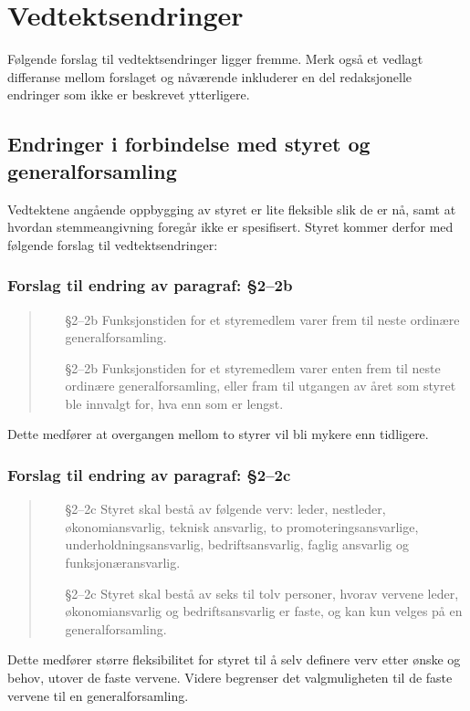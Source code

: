 \documentclass[10pt,norsk,a4paper]{article}
\begin{document}
\section{Vedtektsendringer}
Følgende forslag til vedtektsendringer ligger fremme. Merk også et vedlagt differanse mellom forslaget og nåværende inkluderer en del redaksjonelle endringer som ikke er beskrevet ytterligere.

\subsection{Endringer i forbindelse med styret og generalforsamling}
Vedtektene angående oppbygging av styret er lite fleksible slik de er nå, samt at hvordan stemmeangivning foregår ikke er spesifisert. Styret kommer derfor med følgende forslag til vedtektsendringer:

\subsubsection{Forslag til endring av paragraf: §2--2b}
\begin{quote}
	\begin{enumerate}
		\item[§2--2b] Funksjonstiden for et styremedlem varer frem til neste ordinære generalforsamling.
		\item[§2--2b] Funksjonstiden for et styremedlem varer enten frem til neste ordinære generalforsamling, eller fram til utgangen av året som styret ble innvalgt for, hva enn som er lengst.
	\end{enumerate}
\end{quote}
Dette medfører at overgangen mellom to styrer vil bli mykere enn tidligere.

\subsubsection{Forslag til endring av paragraf: §2--2c}
\begin{quote}
	\begin{enumerate}
		\item[§2--2c] Styret skal bestå av følgende verv: leder, nestleder, økonomiansvarlig, teknisk ansvarlig, to promoteringsansvarlige, underholdningsansvarlig, bedriftsansvarlig, faglig ansvarlig og funksjonæransvarlig.
		\item[§2--2c] Styret skal bestå av seks til tolv personer, hvorav vervene leder, økonomiansvarlig og bedriftsansvarlig er faste, og kan kun velges på en generalforsamling.
	\end{enumerate}
\end{quote}
Dette medfører større fleksibilitet for styret til å selv definere verv etter ønske og behov, utover de faste vervene. Videre begrenser det valgmuligheten til de faste vervene til en generalforsamling.
\end{document}

